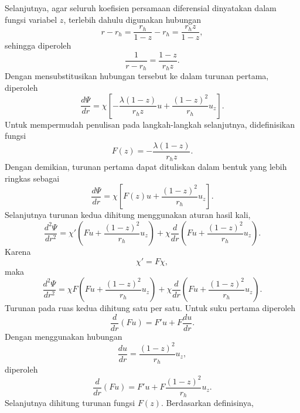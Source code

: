 Selanjutnya, agar seluruh koefisien persamaan diferensial dinyatakan dalam fungsi variabel $z$, terlebih dahulu digunakan hubungan
\begin{equation} r-r_h = \frac{r_h}{1-z} - r_h = \frac{r_hz}{1-z}, \end{equation}
sehingga diperoleh
\begin{equation} \boxed{ \frac{1}{r-r_h} = \frac{1-z}{r_hz}. } \end{equation}
Dengan mensubstitusikan hubungan tersebut ke dalam turunan pertama, diperoleh
\begin{equation} \boxed{ \frac{d\Psi}{dr} = \chi \left[ -\frac{\lambda(1-z)}{r_hz}u + \frac{(1-z)^2}{r_h}u_z \right]. } \end{equation}
Untuk mempermudah penulisan pada langkah-langkah selanjutnya, didefinisikan fungsi
\begin{equation} \boxed{ F(z) = -\frac{\lambda(1-z)}{r_hz}. } \end{equation}
Dengan demikian, turunan pertama dapat dituliskan dalam bentuk yang lebih ringkas sebagai
\begin{equation} \boxed{ \frac{d\Psi}{dr} = \chi \left[ F(z)u + \frac{(1-z)^2}{r_h}u_z \right]. } \end{equation}
Selanjutnya turunan kedua dihitung menggunakan aturan hasil kali,
\begin{equation} \frac{d^2\Psi}{dr^2} = \chi' \left( Fu + \frac{(1-z)^2}{r_h}u_z \right) + \chi \frac{d}{dr} \left( Fu + \frac{(1-z)^2}{r_h}u_z \right). \end{equation}
Karena
\begin{equation} \chi' = F\chi, \end{equation}
maka
\begin{equation} \boxed{ \frac{d^2\Psi}{dr^2} = \chi F \left( Fu + \frac{(1-z)^2}{r_h}u_z \right) + \chi \frac{d}{dr} \left( Fu + \frac{(1-z)^2}{r_h}u_z \right). } \end{equation}
Turunan pada ruas kedua dihitung satu per satu. Untuk suku pertama diperoleh
\begin{equation} \frac{d}{dr}(Fu) = F'u + F \frac{du}{dr}. \end{equation}
Dengan menggunakan hubungan
\begin{equation} \frac{du}{dr} = \frac{(1-z)^2}{r_h}u_z, \end{equation}
diperoleh
\begin{equation} \boxed{ \frac{d}{dr}(Fu) = F'u + F \frac{(1-z)^2}{r_h} u_z. } \end{equation}
Selanjutnya dihitung turunan fungsi $F(z)$. Berdasarkan definisinya,
